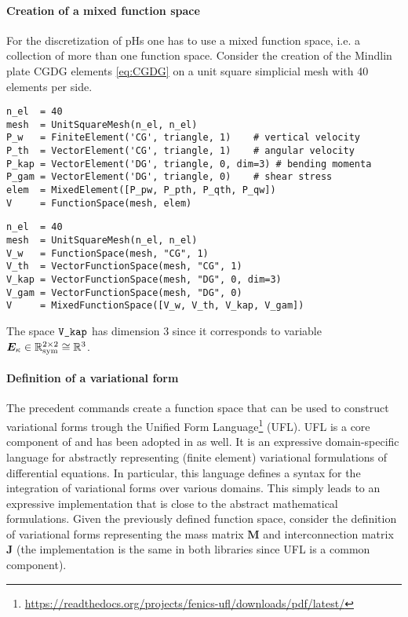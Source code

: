 \paragraph{Creation of a mixed function space}
For the discretization of pHs one has to use a mixed function space, i.e. a collection of more than one function space. Consider the creation of the Mindlin plate CGDG elements \eqref{eq:CGDG} on a unit square simplicial mesh with 40 elements per side.
\begin{tcolorbox}[title = Mixed function space in  \fenics, coltitle=black, breakable, size=fbox, boxrule=1pt, pad at break*=1mm, colframe=red, enlarge top by=0.25em, enlarge bottom by=0.5em]
\begin{Verbatim}[tabsize=4]
n_el  = 40
mesh  = UnitSquareMesh(n_el, n_el)
P_w   = FiniteElement('CG', triangle, 1)   	# vertical velocity
P_th  = VectorElement('CG', triangle, 1)   	# angular velocity
P_kap = VectorElement('DG', triangle, 0, dim=3)	# bending momenta			
P_gam = VectorElement('DG', triangle, 0)	# shear stress 
elem  = MixedElement([P_pw, P_pth, P_qth, P_qw])
V     = FunctionSpace(mesh, elem)
\end{Verbatim}
\end{tcolorbox}
\begin{tcolorbox}[title = Mixed function space in  \firedrake, coltitle=black, breakable, size=fbox, boxrule=1pt, pad at break*=1mm, colframe=cyan, enlarge top by=0.25em, enlarge bottom by=0.5em]
\begin{Verbatim}[tabsize=4]
n_el  = 40
mesh  = UnitSquareMesh(n_el, n_el)
V_w   = FunctionSpace(mesh, "CG", 1)
V_th  = VectorFunctionSpace(mesh, "CG", 1)
V_kap = VectorFunctionSpace(mesh, "DG", 0, dim=3)
V_gam = VectorFunctionSpace(mesh, "DG", 0)
V     = MixedFunctionSpace([V_w, V_th, V_kap, V_gam])
\end{Verbatim}
\end{tcolorbox}
The space $\verb|V_kap|$ has dimension 3 since it corresponds to variable $\bm{E}_\kappa \in \mathbb{R}^{2\times 2}_{\text{sym}} \cong  \mathbb{R}^3$.

\paragraph{Definition of a variational form}
The precedent commands create a function space that can be used to construct variational forms trough the Unified Form Language\footnote{\url{https://readthedocs.org/projects/fenics-ufl/downloads/pdf/latest/}} \cite{alnaes2014} (UFL). UFL is a core component of \fenics and has been adopted in \firedrake as well. It is an expressive domain-specific language for abstractly representing (finite element) variational formulations of differential equations. In particular, this language defines a syntax for the integration of variational forms over various domains. This simply leads to an expressive implementation that is close to the abstract mathematical formulations. Given the previously defined function space, consider the definition of variational forms representing the mass matrix $\mathbf{M}$ and interconnection matrix $\mathbf{J}$ (the implementation is the same in both libraries since UFL is a common component).
 

